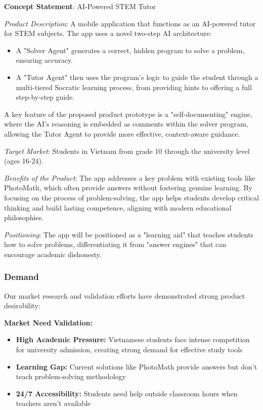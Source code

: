 \begin{mdframed}[linewidth=1pt,linecolor=black,backgroundcolor=white]
\textbf{Concept Statement}: AI-Powered STEM Tutor

\textit{Product Description}: A mobile application that functions as an AI-powered tutor for STEM subjects. The app uses a novel two-step AI architecture:
\begin{itemize}
\item A "Solver Agent" generates a correct, hidden program to solve a problem, ensuring accuracy.
\item A "Tutor Agent" then uses the program's logic to guide the student through a multi-tiered Socratic learning process, from providing hints to offering a full step-by-step guide.
\end{itemize}

A key feature of the proposed product prototype is a "self-documenting" engine, where the AI's reasoning is embedded as comments within the solver program, allowing the Tutor Agent to provide more effective, context-aware guidance.

\textit{Target Market}: Students in Vietnam from grade 10 through the university level (ages 16-24).

\textit{Benefits of the Product}: The app addresses a key problem with existing tools like PhotoMath, which often provide answers without fostering genuine learning. By focusing on the process of problem-solving, the app helps students develop critical thinking and build lasting competence, aligning with modern educational philosophies.

\textit{Positioning}: The app will be positioned as a "learning aid" that teaches students how to solve problems, differentiating it from "answer engines" that can encourage academic dishonesty.
\end{mdframed}

\subsubsection{Demand}
Our market research and validation efforts have demonstrated strong product desirability:

\textbf{Market Need Validation:}
\begin{itemize}
    \item \textbf{High Academic Pressure:} Vietnamese students face intense competition for university admission, creating strong demand for effective study tools
    \item \textbf{Learning Gap:} Current solutions like PhotoMath provide answers but don't teach problem-solving methodology
    \item \textbf{24/7 Accessibility:} Students need help outside classroom hours when teachers aren't available
\end{itemize}


